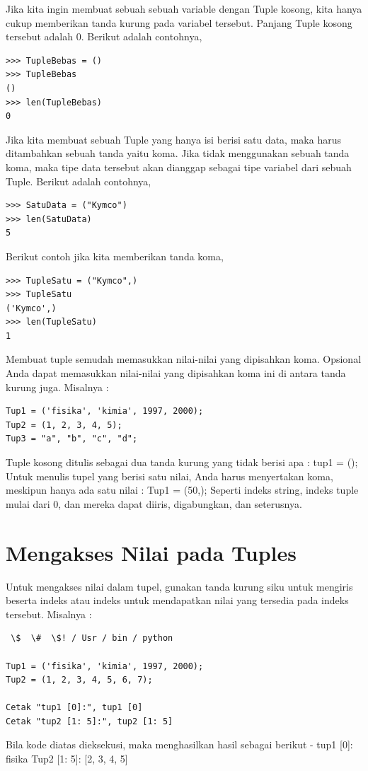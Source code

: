 Jika kita ingin membuat sebuah sebuah variable dengan Tuple kosong, kita hanya cukup memberikan tanda kurung pada variabel tersebut. Panjang Tuple kosong tersebut adalah 0. 
Berikut adalah contohnya, 
\begin{verbatim}
>>> TupleBebas = () 
>>> TupleBebas 
() 
>>> len(TupleBebas) 
0 
\end{verbatim}
Jika kita membuat sebuah Tuple yang hanya isi berisi satu data, maka harus ditambahkan sebuah tanda yaitu koma. Jika tidak menggunakan sebuah tanda koma, maka tipe data tersebut akan dianggap sebagai tipe variabel dari sebuah Tuple. Berikut adalah contohnya, 
\begin{verbatim}
>>> SatuData = ("Kymco") 
>>> len(SatuData) 
5 
\end{verbatim}
 Berikut contoh jika kita memberikan tanda koma, 
\begin{verbatim}
>>> TupleSatu = ("Kymco",) 
>>> TupleSatu 
('Kymco',) 
>>> len(TupleSatu) 
1 
\end{verbatim}
Membuat tuple semudah memasukkan nilai-nilai yang dipisahkan koma. Opsional Anda dapat memasukkan nilai-nilai yang dipisahkan koma ini di antara tanda kurung juga. Misalnya : 
\begin{verbatim}
Tup1 = ('fisika', 'kimia', 1997, 2000); 
Tup2 = (1, 2, 3, 4, 5); 
Tup3 = "a", "b", "c", "d"; 
\end{verbatim}
Tuple kosong ditulis sebagai dua tanda kurung yang tidak berisi apa : 
tup1 = (); 
Untuk menulis tupel yang berisi satu nilai, Anda harus menyertakan koma, meskipun hanya ada satu nilai : 
Tup1 = (50,); 
Seperti indeks string, indeks tuple mulai dari 0, dan mereka dapat diiris, digabungkan, dan seterusnya. 
\section{Mengakses Nilai pada Tuples} 
Untuk mengakses nilai dalam tupel, gunakan tanda kurung siku untuk mengiris beserta indeks atau indeks untuk mendapatkan nilai yang tersedia pada indeks tersebut. Misalnya : 
\begin{verbatim}
 \$  \#  \$! / Usr / bin / python 

Tup1 = ('fisika', 'kimia', 1997, 2000); 
Tup2 = (1, 2, 3, 4, 5, 6, 7); 

Cetak "tup1 [0]:", tup1 [0] 
Cetak "tup2 [1: 5]:", tup2 [1: 5] 
\end{verbatim}
Bila kode diatas dieksekusi, maka menghasilkan hasil sebagai berikut - 
tup1 [0]: fisika 
Tup2 [1: 5]: [2, 3, 4, 5] 
